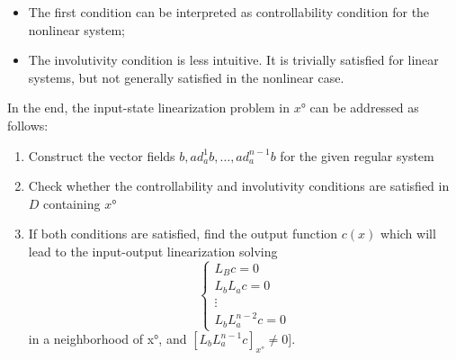 \begin{remark}
	\begin{itemize}
		\item The first condition can be interpreted as controllability condition for the nonlinear system;
		\item The involutivity condition is less intuitive. It is trivially satisfied for linear systems, but not generally satisfied in the nonlinear case.
	\end{itemize}
\end{remark}
In the end, the input-state linearization problem in $x°$ can be addressed as follows:
\begin{enumerate}
	\item  Construct the vector fields ${b,ad_a^1b,\dots,ad_a^{n-1}b}$ for the given regular
	system
	\item Check whether the controllability and involutivity conditions are
	satisfied in $D$ containing $x°$
	\item If both conditions are satisfied, find the output function $c(x)$ which
	will lead to the input-output linearization solving
	 \begin{equation*}
		\left\{
		\begin{array}{ll}	
			L_Bc=0\\
			L_bL_ac=0\\
			\vdots\\
			L_bL_a^{n-2}c=0
		\end{array}
		\right.
	\end{equation*} in a neighborhood of x°, and $[L_bL_a^{n-1}c]_{x°}\neq0]$.
\end{enumerate}

